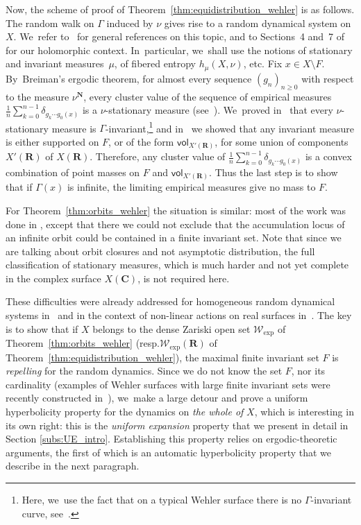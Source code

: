 \documentclass[11pt]{article}
\newcommand{\resp}{resp.\xspace}
\newcommand{\unsur}[1]{\frac{1}{#1}}
\def\C{\mathbf{C}}
\def\R{\mathbf{R}}
\def\N{\mathbf{N}}
\newcommand{\cW}{\mathcal{W}}
\newcommand{\vol}{{\mathsf{vol}}}
\theoremstyle{plain}
\theoremstyle{definition}
\numberwithin{equation}{section}
\begin{document}
Now, the scheme of proof of Theorem~\ref{thm:equidistribution_wehler} is as follows.
The random walk on $\Gamma$ induced by $\nu$ gives rise to a random dynamical system on $X$. We~refer to~\cite{Kifer, br} for general references on this topic,
and to Sections~4 and~7 of \cite{stiffness} for our holomorphic context. In~particular, we~shall use the notions of stationary and invariant measures~$\mu$, of fibered entropy $h_\mu(X,\nu)$, etc.
Fix $x\in X\setminus F$. By~Breiman's ergodic theorem, for almost every sequence $(g_n)_{n\geq 0}$ with respect to the measure $\nu^\N$,
every cluster value of the sequence of
empirical measures
$\unsur{n} \sum_{k=0}^{n-1} \delta_{g_k\cdots g_0(x)}$ is a $\nu$-stationary measure (see~\cite[\S 2.2]{benoist-quint_book}). We~proved in~\cite{stiffness} that every $\nu$-stationary measure is $\Gamma$-invariant,\footnote{Here, we~use the fact that on
a typical Wehler surface there is no $\Gamma$-invariant curve, see~\cite[Lem.\,2.3]{finite_orbits}.}
and in~\cite{invariant} we showed that any invariant measure is either supported on $F$, or of the
form $\vol_{X'(\R)}$, for some union of components $X'(\R)$ of $X(\R)$. Therefore, any cluster value of
$\unsur{n} \sum_{k=0}^{n-1} \delta_{g_k\cdots g_0(x)}$ is a convex combination of point masses on $F$ and
$\vol_{X'(\R)}$. Thus the last step is to show that if $\Gamma(x)$ is infinite, the limiting empirical
measures give no mass to $F$.

For Theorem~\ref{thm:orbits_wehler} the situation is similar:
most of the work was done in \cite[\S 8]{invariant}, except that there we could not exclude
that the accumulation locus of an infinite orbit could be contained in a finite invariant set.
Note that since we are talking about orbit closures and not asymptotic distribution,
the full classification of stationary measures,
which is much harder and not yet complete in the
complex surface $X(\C)$, is not required here.

These difficulties were already addressed for homogeneous random dynamical systems in~\cite{benoist-quint3, Eskin-Lindenstrauss:RandomWalk} and in the context of non-linear actions on real
surfaces in~\cite{liu_thesis, chung}.
The key is to show that if $X$ belongs to the
dense Zariski open set $ \cW_{\mathrm{exp}}$ of Theorem~\ref{thm:orbits_wehler}
(\resp $ \cW_{\mathrm{exp}}(\R)$ of Theorem~\ref{thm:equidistribution_wehler}), the maximal finite invariant set
$F$ is \emph{repelling} for the random dynamics. Since we do not know the set $F$, nor its cardinality (examples of Wehler surfaces with large finite invariant sets were recently constructed
in~\cite{fuchs-litman-silverman-tran}), we~make a large detour and prove a uniform
hyperbolicity property for
the dynamics on \emph{the whole of} $X$, which is interesting in its own right: this is the \emph{uniform expansion} property that we present in detail in Section \ref{subs:UE_intro}.
Establishing this property relies on ergodic-theoretic arguments, the first of which is an
automatic hyperbolicity property that we describe in the next paragraph.
\end{document}

